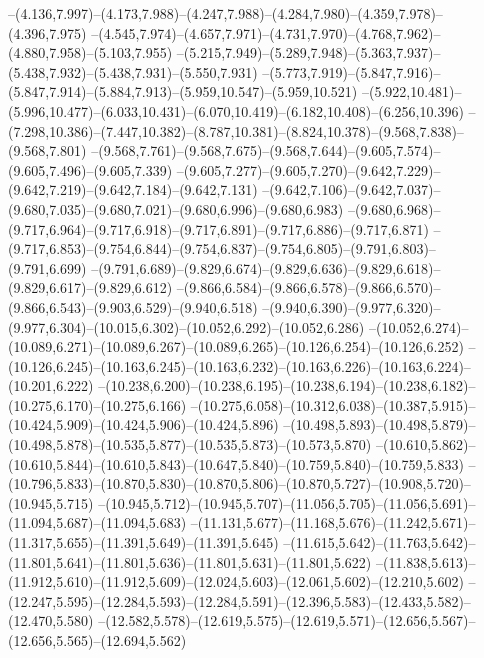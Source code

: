   --(4.136,7.997)--(4.173,7.988)--(4.247,7.988)--(4.284,7.980)--(4.359,7.978)--(4.396,7.975)%
  --(4.545,7.974)--(4.657,7.971)--(4.731,7.970)--(4.768,7.962)--(4.880,7.958)--(5.103,7.955)%
  --(5.215,7.949)--(5.289,7.948)--(5.363,7.937)--(5.438,7.932)--(5.438,7.931)--(5.550,7.931)%
  --(5.773,7.919)--(5.847,7.916)--(5.847,7.914)--(5.884,7.913)--(5.959,10.547)--(5.959,10.521)%
  --(5.922,10.481)--(5.996,10.477)--(6.033,10.431)--(6.070,10.419)--(6.182,10.408)--(6.256,10.396)%
  --(7.298,10.386)--(7.447,10.382)--(8.787,10.381)--(8.824,10.378)--(9.568,7.838)--(9.568,7.801)%
  --(9.568,7.761)--(9.568,7.675)--(9.568,7.644)--(9.605,7.574)--(9.605,7.496)--(9.605,7.339)%
  --(9.605,7.277)--(9.605,7.270)--(9.642,7.229)--(9.642,7.219)--(9.642,7.184)--(9.642,7.131)%
  --(9.642,7.106)--(9.642,7.037)--(9.680,7.035)--(9.680,7.021)--(9.680,6.996)--(9.680,6.983)%
  --(9.680,6.968)--(9.717,6.964)--(9.717,6.918)--(9.717,6.891)--(9.717,6.886)--(9.717,6.871)%
  --(9.717,6.853)--(9.754,6.844)--(9.754,6.837)--(9.754,6.805)--(9.791,6.803)--(9.791,6.699)%
  --(9.791,6.689)--(9.829,6.674)--(9.829,6.636)--(9.829,6.618)--(9.829,6.617)--(9.829,6.612)%
  --(9.866,6.584)--(9.866,6.578)--(9.866,6.570)--(9.866,6.543)--(9.903,6.529)--(9.940,6.518)%
  --(9.940,6.390)--(9.977,6.320)--(9.977,6.304)--(10.015,6.302)--(10.052,6.292)--(10.052,6.286)%
  --(10.052,6.274)--(10.089,6.271)--(10.089,6.267)--(10.089,6.265)--(10.126,6.254)--(10.126,6.252)%
  --(10.126,6.245)--(10.163,6.245)--(10.163,6.232)--(10.163,6.226)--(10.163,6.224)--(10.201,6.222)%
  --(10.238,6.200)--(10.238,6.195)--(10.238,6.194)--(10.238,6.182)--(10.275,6.170)--(10.275,6.166)%
  --(10.275,6.058)--(10.312,6.038)--(10.387,5.915)--(10.424,5.909)--(10.424,5.906)--(10.424,5.896)%
  --(10.498,5.893)--(10.498,5.879)--(10.498,5.878)--(10.535,5.877)--(10.535,5.873)--(10.573,5.870)%
  --(10.610,5.862)--(10.610,5.844)--(10.610,5.843)--(10.647,5.840)--(10.759,5.840)--(10.759,5.833)%
  --(10.796,5.833)--(10.870,5.830)--(10.870,5.806)--(10.870,5.727)--(10.908,5.720)--(10.945,5.715)%
  --(10.945,5.712)--(10.945,5.707)--(11.056,5.705)--(11.056,5.691)--(11.094,5.687)--(11.094,5.683)%
  --(11.131,5.677)--(11.168,5.676)--(11.242,5.671)--(11.317,5.655)--(11.391,5.649)--(11.391,5.645)%
  --(11.615,5.642)--(11.763,5.642)--(11.801,5.641)--(11.801,5.636)--(11.801,5.631)--(11.801,5.622)%
  --(11.838,5.613)--(11.912,5.610)--(11.912,5.609)--(12.024,5.603)--(12.061,5.602)--(12.210,5.602)%
  --(12.247,5.595)--(12.284,5.593)--(12.284,5.591)--(12.396,5.583)--(12.433,5.582)--(12.470,5.580)%
  --(12.582,5.578)--(12.619,5.575)--(12.619,5.571)--(12.656,5.567)--(12.656,5.565)--(12.694,5.562)%
